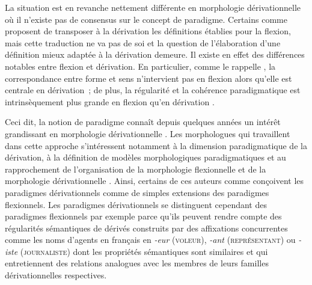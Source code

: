 \documentclass[output=paper]{langsci/langscibook}
\begin{document}
La situation est en revanche nettement différente en morphologie dérivationnelle où il n'existe pas de consensus sur le concept de paradigme.  Certains comme \citet{stump1991.language} proposent de transposer à la dérivation les définitions établies pour la flexion, mais cette traduction ne va pas de soi et la question de l'élaboration d'une définition mieux adaptée à la dérivation demeure.   Il existe en effet des différences notables entre flexion et dérivation.  En particulier, comme le rappelle \citet{Stump01},  la correspondance entre forme et sens n'intervient pas en flexion alors qu'elle est centrale en dérivation~; de plus, la régularité et la cohérence paradigmatique est intrinsèquement plus grande en flexion qu'en dérivation \citep{pounder2000.paradigms,stekauer2014.derivational-paradigms}.

Ceci dit, la notion de paradigme connaît depuis quelques années un intérêt grandissant en morphologie dérivationnelle \citep{stekauer2014.derivational-paradigms,BoSchal16}.  Les morphologues qui travaillent dans cette approche s'intéressent notamment à la dimension paradigmatique de la dérivation, à la définition de modèles morphologiques paradigmatiques et au rapprochement de l'organisation de la morphologie flexionnelle et de la morphologie dérivationnelle \citep{vanMarle85,stump1991.language,Bochner93,Booij1996,pounder2000.paradigms,Hathout2009,roche2009.bslp,hathout2011.dumal,roche2011.intro-dumal,roche2014.CMLF,strnadova2014.phd,strnadova2015.decembrettes}.  Ainsi, certains de ces auteurs comme \cite{vanMarle85,stump1991.language,pounder2000.paradigms} conçoivent les paradigmes dérivationnels comme de simples extensions des paradigmes flexionnels.  Les paradigmes dérivationnels se distinguent cependant des paradigmes flexionnels par exemple parce qu'ils peuvent  rendre compte des régularités sémantiques de dérivés construits par des affixations concurrentes comme les noms d'agents en français en \emph{\mbox{-eur}} (\textsc{voleur}), \emph{\mbox{-ant}} (\textsc{représentant}) ou  \emph{\mbox{-iste}} (\textsc{journaliste}) dont les propriétés sémantiques sont similaires et qui entretiennent des relations analogues avec les membres de leurs familles dérivationnelles respectives.
\end{document}
